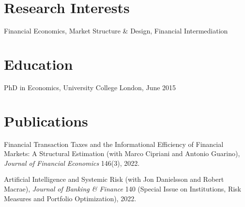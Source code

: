 \documentclass[margin,line, 11pt]{res}
\newenvironment{list1}{
  \begin{list}{\ding{113}}{%
      \setlength{\itemsep}{0in}
      \setlength{\parsep}{0in} \setlength{\parskip}{0in}
      \setlength{\topsep}{0in} \setlength{\partopsep}{0in} 
      \setlength{\leftmargin}{0.17in}}}{\end{list}}
\begin{document}
\begin{resume}
\section{\sc Research Interests}
\begin{list1}
\item[] Financial Economics, Market Structure \& Design, Financial Intermediation
\end{list1}

\section{\sc Education}

\begin{list1}
\item[] PhD in Economics, University College London, June 2015
\vspace*{0.2cm}

\end{list1}

\section{\sc Publications}
\begin{list1}
\item[] Financial Transaction Taxes and the Informational Efficiency of Financial Markets: A Structural Estimation (with Marco Cipriani and Antonio Guarino), \textit{Journal of Financial Economics} 146(3), 2022.
\vspace*{0.2cm}
\item[] Artificial Intelligence and Systemic Risk (with Jon Danielsson and Robert Macrae), \textit{Journal of Banking \& Finance} 140 (Special Issue on Institutions, Risk Measures and Portfolio Optimization), 2022.
\end{list1}


\end{resume}
\end{document}

